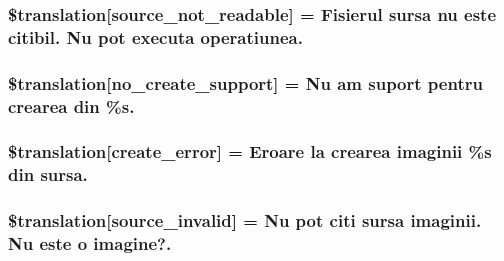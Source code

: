 \subsubsection[{\$translation}]{\setlength{\rightskip}{0pt plus 5cm}\$translation\mbox{[}\textquotesingle{}source\+\_\+not\+\_\+readable\textquotesingle{}\mbox{]} = \textquotesingle{}Fisierul sursa nu este citibil. Nu pot executa operatiunea.\textquotesingle{}}\label{class_8upload_8ro___r_o_8php_a922967ca2df0efdd455261142d8e5715}
\hypertarget{class_8upload_8ro___r_o_8php_a346dfd1ade29f583dd20d345c436859f}{}
\subsubsection[{\$translation}]{\setlength{\rightskip}{0pt plus 5cm}\$translation\mbox{[}\textquotesingle{}no\+\_\+create\+\_\+support\textquotesingle{}\mbox{]} = \textquotesingle{}Nu am suport pentru crearea din \%s.\textquotesingle{}}\label{class_8upload_8ro___r_o_8php_a346dfd1ade29f583dd20d345c436859f}
\hypertarget{class_8upload_8ro___r_o_8php_a53013ce9255c4e1849098ddd9fdb2b3f}{}
\subsubsection[{\$translation}]{\setlength{\rightskip}{0pt plus 5cm}\$translation\mbox{[}\textquotesingle{}create\+\_\+error\textquotesingle{}\mbox{]} = \textquotesingle{}Eroare la crearea imaginii \%s din sursa.\textquotesingle{}}\label{class_8upload_8ro___r_o_8php_a53013ce9255c4e1849098ddd9fdb2b3f}
\hypertarget{class_8upload_8ro___r_o_8php_a6ab0a660b457eaf2d3434b225449fdd6}{}
\subsubsection[{\$translation}]{\setlength{\rightskip}{0pt plus 5cm}\$translation\mbox{[}\textquotesingle{}source\+\_\+invalid\textquotesingle{}\mbox{]} = \textquotesingle{}Nu pot citi sursa imaginii. Nu este o imagine?.\textquotesingle{}}\label{class_8upload_8ro___r_o_8php_a6ab0a660b457eaf2d3434b225449fdd6}
\hypertarget{class_8upload_8ro___r_o_8php_a7f3dfcc0db4bbc0f2e7210c439798e56}{}
